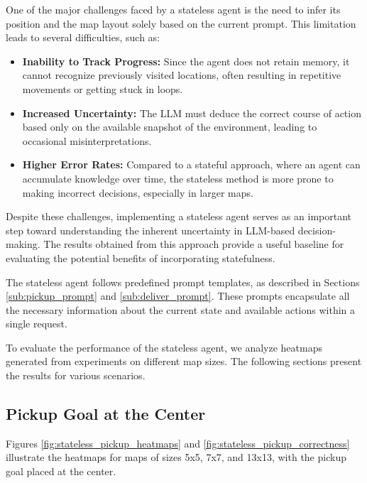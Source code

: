 One of the major challenges faced by a stateless agent is the need to infer its
position and the map layout solely based on the current prompt. This limitation leads
to several difficulties, such as:
\begin{itemize}
  \item \textbf{Inability to Track Progress:} Since the agent does not retain
    memory, it cannot recognize previously visited locations, often resulting in
    repetitive movements or getting stuck in loops.

  \item \textbf{Increased Uncertainty:} The LLM must deduce the correct course
    of action based only on the available snapshot of the environment, leading to
    occasional misinterpretations.

  \item \textbf{Higher Error Rates:} Compared to a stateful approach, where an agent
    can accumulate knowledge over time, the stateless method is more prone to
    making incorrect decisions, especially in larger maps.
\end{itemize}

Despite these challenges, implementing a stateless agent serves as an important step
toward understanding the inherent uncertainty in LLM-based decision-making. The
results obtained from this approach provide a useful baseline for evaluating the
potential benefits of incorporating statefulness.

The stateless agent follows predefined prompt templates, as described in Sections
\ref{sub:pickup_prompt} and \ref{sub:deliver_prompt}. These prompts encapsulate
all the necessary information about the current state and available actions
within a single request.

To evaluate the performance of the stateless agent, we analyze heatmaps generated
from experiments on different map sizes. The following sections present the
results for various scenarios.

\subsection{Pickup Goal at the Center}
\label{sub:pickup_goal_at_the_center}

Figures \ref{fig:stateless_pickup_heatmaps} and \ref{fig:stateless_pickup_correctness}
illustrate the heatmaps for maps of sizes 5x5, 7x7, and 13x13, with the pickup
goal placed at the center.

